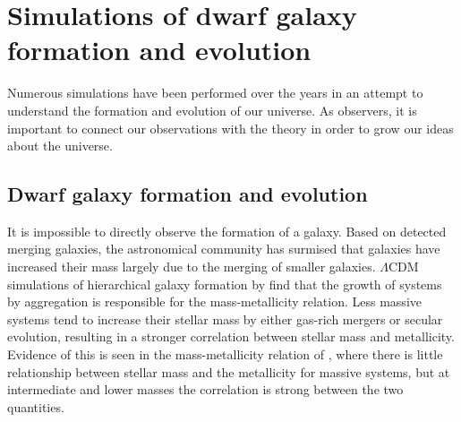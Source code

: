 \chapter[Simulations]{Simulations of dwarf galaxy formation and evolution}


Numerous simulations have been performed over the years in an attempt to 
understand the formation and evolution of our universe.  As observers, it is 
important to connect our observations with the theory in order to grow our ideas 
about the universe.


\section{Dwarf galaxy formation and evolution}

It is impossible to directly observe the formation of a galaxy.  Based on 
detected merging galaxies, the astronomical community has surmised that galaxies 
have increased their mass largely due to the merging of smaller galaxies.  
$\Lambda$CDM simulations of hierarchical galaxy formation by \cite{deRossi07} 
find that the growth of systems by aggregation is responsible for the 
mass-metallicity relation.  Less massive systems tend to increase their stellar 
mass by either gas-rich mergers or secular evolution, resulting in a stronger 
correlation between stellar mass and metallicity.  Evidence of this is seen in 
the mass-metallicity relation of \cite{Tremonti04}, where there is little 
relationship between stellar mass and the metallicity for massive systems, but 
at intermediate and lower masses the correlation is strong between the two 
quantities.

